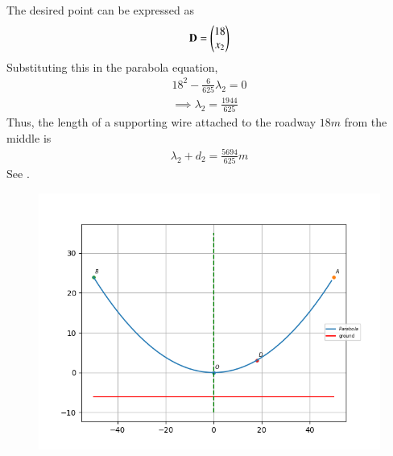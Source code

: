 The desired point can be expressed as
\begin{align}
	\mathbf{D} = \begin{pmatrix}18 \\ x_2\end{pmatrix}
\end{align}
Substituting this in the parabola equation,
\begin{align}
    18^2 - \frac{6}{625}\lambda_2 = 0
    \\
\implies \lambda_2 = \frac{1944}{625}
\end{align}
Thus, the length of a supporting wire attached to the roadway $18 m$ from the middle is 
\begin{align}
     \lambda_2 + d_2 = \frac{5694}{625} m   
\end{align}
See  
    .
\begin{figure}[!htb]
    \centering
    \includegraphics[width=\columnwidth]{chapters/11/11/5/3/figs/parabola.png}
    \caption{}
    \label{fig:chapters/11/11/5/3/parabola}
\end{figure}

